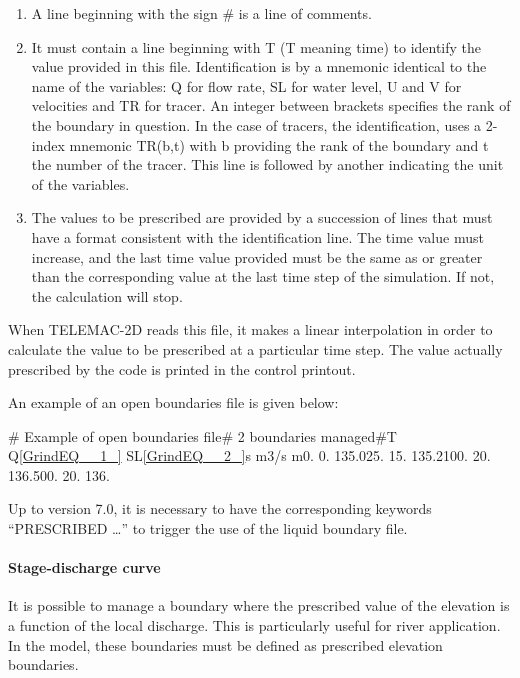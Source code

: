 \documentclass{article} %
\begin{document}
\begin{enumerate}
\item  A line beginning with the sign \# is a line of comments.

\item  It must contain a line beginning with T (T meaning time) to identify the value provided in this file. Identification is by a mnemonic identical to the name of the variables: Q for flow rate, SL for water level, U and V for velocities and TR for tracer. An integer between brackets specifies the rank of the boundary in question. In the case of tracers, the identification, uses a 2-index mnemonic TR(b,t) with b providing the rank of the boundary and t the number of the tracer. This line is followed by another indicating the unit of the variables.

\item  The values to be prescribed are provided by a succession of lines that must have a format consistent with the identification line. The time value must increase, and the last time value provided must be the same as or greater than the corresponding value at the last time step of the simulation. If not, the calculation will stop.
\end{enumerate}

 When TELEMAC-2D reads this file, it makes a linear interpolation in order to calculate the value to be prescribed at a particular time step. The value actually prescribed by the code is printed in the control printout.

 An example of an open boundaries file is given below:

 \#  Example of open boundaries file\#  2 boundaries managed\#T  Q\eqref{GrindEQ__1_} SL\eqref{GrindEQ__2_}s  m3/s m0.  0. 135.025. 15. 135.2100. 20. 136.500. 20. 136.


 Up to version 7.0, it is necessary to have the corresponding keywords ``PRESCRIBED {\dots}'' to trigger the use of the liquid boundary file.


\paragraph{  Stage-discharge curve}

 It is possible to manage a boundary where the prescribed value of the elevation is a function of the local discharge. This is particularly useful for river application. In the model, these boundaries must be defined as prescribed elevation boundaries.
\end{document}
